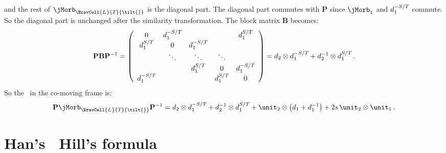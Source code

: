 and the rest of $\jMorb_{\BravCell{\speriod{}}{\period{}}{\tilt{}}}$ is the diagonal part. The diagonal part commutes with ${\mathbf{P}}$ since $\mathbf{\jMorb}_{1}$ and $d_1^{-S/{T_{}}}$ commute. So the diagonal part is unchanged after the similarity transformation. The block matrix $\mathbf{B}$ becomes:
\[
{\mathbf{P}} \mathbf{B} {\mathbf{P}}^{-1}
=
\left(
\begin{array}{ccccc}
 0 & d_1^{-S/{T_{}}} &  &  & d_1^{S/{T_{}}} \\
 d_1^{S/{T_{}}} & 0 & d_1^{-S/{T_{}}} &  &  \\
  & \ddots & \ddots & \ddots &  \\
  &  & d_1^{S/{T_{}}} & 0 & d_1^{-S/{T_{}}} \\
 d_1^{-S/{T_{}}} &  &  & d_1^{S/{T_{}}} & 0 \\
\end{array}
\right)
=
d_2 \otimes d_1^{-S/{T_{}}} + d_2^{-1} \otimes d_1^{S/{T_{}}} \, .
\]
So the \jacobianOrb\ in the co-moving frame is:
\[
{\mathbf{P}} \jMorb_{\BravCell{\speriod{}}{\period{}}{\tilt{}}} {\mathbf{P}}^{-1}
=
\shift_2 \otimes \shift_1^{-S/\period{}} + \shift_2^{-1} \otimes \shift_1^{S/\period{}}
+
\unit_{2} \otimes \left(\shift_{1}+\shift_{1}^{-1}\right)
+
2 {s}\,\unit_2\otimes\unit_{1}
\, .
\]

\section{Han's  \HenonMap\ Hill's formula}
\label{sect:HenonHillHan}

